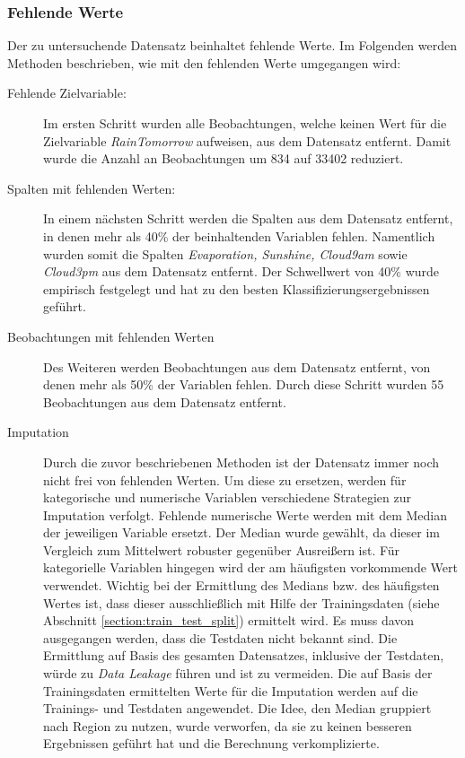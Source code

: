 \subsubsection{Fehlende Werte}
Der zu untersuchende Datensatz beinhaltet fehlende Werte. Im Folgenden werden Methoden beschrieben, wie mit den fehlenden Werte umgegangen wird:
\begin{description}
	\item[Fehlende Zielvariable:]
	 Im ersten Schritt wurden alle Beobachtungen, welche keinen Wert für die Zielvariable \emph{RainTomorrow} aufweisen, aus dem Datensatz entfernt. Damit wurde die Anzahl an Beobachtungen um 834 auf 33402 reduziert.
	 \item[Spalten mit fehlenden Werten:]
	 In einem nächsten Schritt werden die Spalten aus dem Datensatz entfernt, in denen mehr als 40\% der beinhaltenden Variablen fehlen. Namentlich wurden somit die Spalten \emph{Evaporation, Sunshine, Cloud9am} sowie \emph{Cloud3pm} aus dem Datensatz entfernt. Der Schwellwert von 40\% wurde empirisch festgelegt und hat zu den besten Klassifizierungsergebnissen geführt.
	 \item[Beobachtungen mit fehlenden Werten]
	 Des Weiteren werden Beobachtungen aus dem Datensatz entfernt, von denen mehr als 50\% der Variablen fehlen. Durch diese Schritt wurden 55 Beobachtungen aus dem Datensatz entfernt.
	 \item[Imputation]
	 Durch die zuvor beschriebenen Methoden ist der Datensatz immer noch  nicht frei von fehlenden Werten. Um diese zu ersetzen, werden für kategorische und numerische Variablen verschiedene Strategien zur Imputation verfolgt. Fehlende numerische Werte werden mit dem Median der jeweiligen Variable ersetzt. Der Median wurde gewählt, da dieser im Vergleich zum Mittelwert robuster gegenüber Ausreißern ist. Für kategorielle Variablen hingegen wird der am häufigsten vorkommende Wert verwendet. Wichtig bei der Ermittlung des Medians bzw. des häufigsten Wertes ist, dass dieser ausschließlich mit Hilfe der Trainingsdaten (siehe Abschnitt \ref{section:train_test_split}) ermittelt wird. Es muss davon ausgegangen werden, dass die Testdaten nicht bekannt sind. Die Ermittlung auf Basis des gesamten Datensatzes, inklusive der Testdaten, würde zu \emph{Data Leakage} führen und ist zu vermeiden. Die auf Basis der Trainingsdaten ermittelten Werte für die Imputation werden auf die Trainings- und Testdaten angewendet. Die Idee, den Median gruppiert nach Region zu nutzen, wurde verworfen, da sie zu keinen besseren Ergebnissen geführt hat und die Berechnung verkomplizierte.
\end{description}

